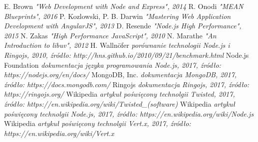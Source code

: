 \documentclass[12pt]{report}
\begin{document}
\begin{thebibliography}{99}
E. Brown
\textit{"Web Development with Node and Express", 2014}
R. Onodi
\textit{"MEAN Blueprints", 2016}
P. Kozlowski, P. B. Darwin
\textit{"Mastering Web Application Development with AngularJS", 2013}
D. Resende 
\textit{"Node.js High Performance", 2015}
N. Zakas
\textit{"High Performance JavaScript", 2010}
N. Marathe
\textit{"An Introduction to libuv", 2012}
H. Wallnöfer
\textit{porównanie technologii Node.js i Ringojs, 2010, źródło: http://hns.github.io/2010/09/21/benchmark.html}
Node.js Foundation
\textit{dokumentacja języka programowania Node.js, 2017, źródło: https://nodejs.org/en/docs/}
MongoDB, Inc.
\textit{dokumentacja MongoDB, 2017, źródło: https://docs.mongodb.com/}
Ringojs
\textit{dokumentacja Ringojs, 2017, źródło: https://ringojs.org/}
Wikipedia
\textit{artykuł poświęcony technolgii Twisted, 2017, źródło: https://en.wikipedia.org/wiki/Twisted_(software)}
Wikipedia
\textit{artykuł poświęcony technolgii Node.js, 2017, źródło: https://en.wikipedia.org/wiki/Node.js}
Wikipedia
\textit{artykuł poświęcony technolgii Vert.x, 2017, źródło: https://en.wikipedia.org/wiki/Vert.x}
\end{thebibliography}
\listoffigures
\end{document}
